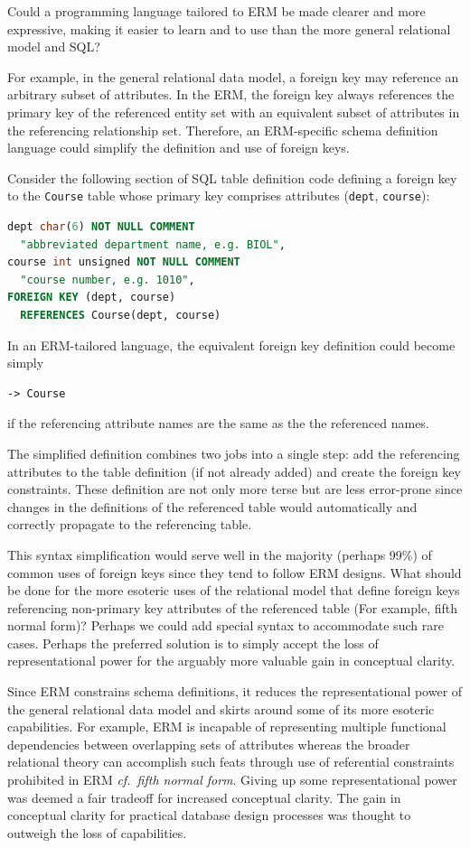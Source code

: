 \documentclass[letter,10pt]{article}
\begin{document}
Could a programming language tailored to ERM be made clearer and more expressive, making it easier to learn and to use than the more general relational model and SQL? 

For example, in the general relational data model, a foreign key may reference an arbitrary subset of attributes. In the ERM, the foreign key always references the primary key of the referenced entity set with an equivalent subset of attributes in the referencing relationship set.  Therefore, an ERM-specific schema definition language could simplify the definition and use of foreign keys.

Consider the following section of SQL table definition code defining a foreign key to the {\tt Course} table whose primary key comprises attributes ({\tt dept}, {\tt course}):
\begin{lstlisting}[language=SQL,morekeywords={COMMENT, REFERENCES, unsigned}]
dept char(6) NOT NULL COMMENT 
  "abbreviated department name, e.g. BIOL",
course int unsigned NOT NULL COMMENT 
  "course number, e.g. 1010",
FOREIGN KEY (dept, course) 
  REFERENCES Course(dept, course)
\end{lstlisting}
In an ERM-tailored language, the equivalent foreign key definition could become simply
\begin{lstlisting}[language=dj]
-> Course
\end{lstlisting}
if the referencing attribute names are the same as the the referenced names.

The simplified definition combines two jobs into a single step:  add the referencing attributes to the table definition (if not already added) and create the foreign key constraints.  These definition are not only more terse but are less error-prone since changes in the definitions of the referenced table would automatically and correctly propagate to the referencing table. 

This syntax simplification would serve well in the majority (perhaps 99\%) of common uses of foreign keys since they tend to follow ERM designs. What should be done for the more esoteric uses of the relational model that define foreign keys referencing non-primary key attributes of the referenced table (For example, fifth normal form)?  Perhaps we could add special syntax to accommodate such rare cases. Perhaps the preferred solution is to simply accept the loss of representational power for the arguably more valuable gain in conceptual clarity. 

Since ERM constrains schema definitions, it reduces the representational power of the general relational data model and skirts around some of its more esoteric capabilities. 
For example, ERM is incapable of representing multiple functional dependencies between overlapping sets of attributes whereas the broader relational theory can accomplish such feats through use of referential constraints prohibited in ERM {\em cf.\ fifth normal form}.
Giving up some representational power was deemed a fair tradeoff for increased conceptual clarity.  The gain in conceptual clarity for practical database design processes was thought to outweigh the loss of capabilities.
\end{document}
